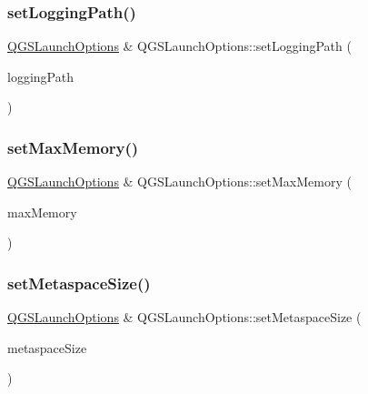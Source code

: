 \mbox{\label{class_q_g_s_launch_options_ae47661e30320c9ce657104590393148c}} 
\subsubsection{\texorpdfstring{set\+Logging\+Path()}{setLoggingPath()}}
{\footnotesize\ttfamily \mbox{\hyperlink{class_q_g_s_launch_options}{Q\+G\+S\+Launch\+Options}} \& Q\+G\+S\+Launch\+Options\+::set\+Logging\+Path (\begin{DoxyParamCaption}\item[{const Q\+String \&}]{logging\+Path }\end{DoxyParamCaption})}

\mbox{\label{class_q_g_s_launch_options_a8449319a5e0689692af5a43e4ea6e95b}} 
\subsubsection{\texorpdfstring{set\+Max\+Memory()}{setMaxMemory()}}
{\footnotesize\ttfamily \mbox{\hyperlink{class_q_g_s_launch_options}{Q\+G\+S\+Launch\+Options}} \& Q\+G\+S\+Launch\+Options\+::set\+Max\+Memory (\begin{DoxyParamCaption}\item[{const int}]{max\+Memory }\end{DoxyParamCaption})}

\mbox{\label{class_q_g_s_launch_options_a1f06ff676048dd9a521543347a6a832b}} 
\subsubsection{\texorpdfstring{set\+Metaspace\+Size()}{setMetaspaceSize()}}
{\footnotesize\ttfamily \mbox{\hyperlink{class_q_g_s_launch_options}{Q\+G\+S\+Launch\+Options}} \& Q\+G\+S\+Launch\+Options\+::set\+Metaspace\+Size (\begin{DoxyParamCaption}\item[{const int}]{metaspace\+Size }\end{DoxyParamCaption})}

